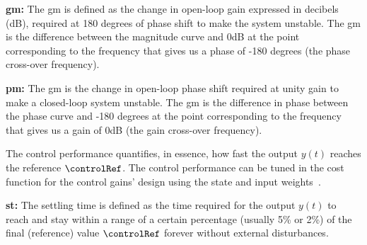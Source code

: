 \noindent\textbf{\Acrfull{gm}:} The \gls{gm} is defined as the change in open-loop gain expressed in decibels (dB), required at 180 degrees of phase shift to make the system unstable. 
The \gls{gm} is the difference between the magnitude curve and 0dB at the point corresponding to the frequency that gives us a phase of -180 degrees (the phase cross-over frequency).
 
\noindent\textbf{\Acrfull{pm}:} The \gls{gm} is the change in open-loop phase shift required at unity gain to make a closed-loop system unstable.
The \gls{gm} is the difference in phase between the phase curve and -180 degrees at the point corresponding to the frequency that gives us a gain of 0dB (the gain cross-over frequency).

The control performance quantifies, in essence, how fast the output $y(t)$ reaches the reference $\controlRef$. 
The control performance can be tuned in the cost function for the control gains' design using the state and input weights~\cite{mohamed2019designing}.

\noindent\textbf{\Acrfull{st}:}
The settling time is defined as the time required for the output $y(t)$ to reach and stay within a range of a certain percentage (usually 5\% or 2\%) of the final (reference) value $\controlRef$ forever without external disturbances.